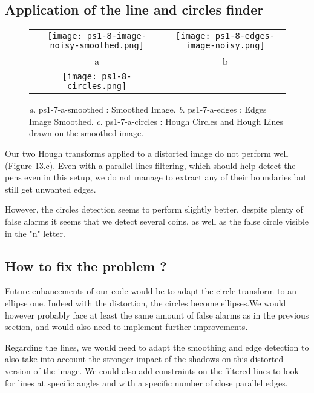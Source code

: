 \documentclass[a4paper,11pt]{article}
\begin{document}
\subsection{Application of the line and circles finder}

 \begin{figure}[H]
\begin{center}
\begin{tabular}{cc}
\texttt{[image: ps1-8-image-noisy-smoothed.png]}&
\texttt{[image: ps1-8-edges-image-noisy.png]}\\
	a&b\\
\texttt{[image: ps1-8-circles.png]}\\	
\end{tabular}
\end{center}
 \caption{
\textit{a}. ps1-7-a-smoothed : Smoothed Image.  \textit{b}. ps1-7-a-edges : Edges Image Smoothed. 
\textit{c}. ps1-7-a-circles :  Hough Circles and Hough Lines drawn on the smoothed image.}
\label{ps1-7}
\end{figure}

Our two Hough transforms applied to a distorted image do not perform well (Figure 13.c). Even with a parallel lines filtering, which should help detect the pens even in this setup, we do not manage to extract any of their boundaries but still get unwanted edges.

However, the circles detection seems to perform slightly better, despite plenty of false alarms it seems that we detect several coins, as well as the false circle visible in the "n" letter.

\subsection{How to fix the problem ?}

Future enhancements of our code would be to adapt the circle transform to an ellipse one. Indeed with the distortion, the circles become ellipses.We would however probably face at least the same amount of false alarms as in the previous section, and would also need to implement further improvements.

Regarding the lines, we would need to adapt the smoothing and edge detection to also take into account the stronger impact of the shadows on this distorted version of the image. We could also add constraints on the filtered lines to look for lines at specific angles and with a specific number of close parallel edges.
\end{document}
